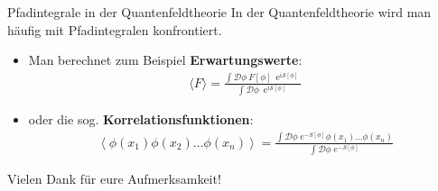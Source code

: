 \begin{frame}{Pfadintegrale in der Quantenfeldtheorie}
In der Quantenfeldtheorie wird man häufig mit Pfadintegralen konfrontiert. \\
\begin{itemize}
	\item Man berechnet zum Beispiel \textbf{Erwartungswerte}:
\begin{align*}
	\langle F \rangle = \frac{\int\mathcal{D}\phi \ F[\phi]\ \operatorname{e}^{i\mathcal{S}[\phi]}}{\int\mathcal{D}\phi \ \operatorname{e}^{i\mathcal{S}[\phi]}}
\end{align*}
\item oder die sog. \textbf{Korrelationsfunktionen}:
\begin{align*}
\left\langle \phi(x_1) \phi(x_2) \ldots \phi(x_n)\right\rangle
=\frac{\int \mathcal D \phi \; e^{-S[\phi]}\phi(x_1)\ldots \phi(x_n)}{\int \mathcal D \phi \; e^{-S[\phi]}}
\end{align*}
\end{itemize}
\end{frame}

\begin{frame}
\begin{block}{\hfill \Large Vielen Dank für eure Aufmerksamkeit! \hfill}
	
\end{block}

\end{frame}